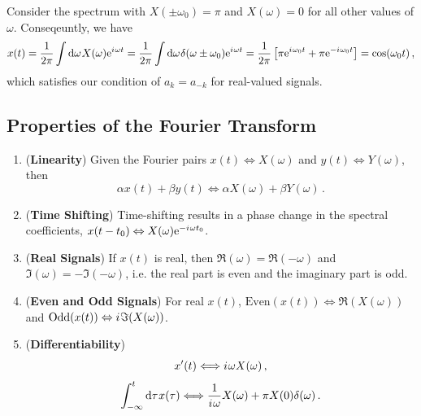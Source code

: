 \begin{exmp}
  Consider the spectrum with $X(\pm\omega_0) = \pi$ and $X(\omega) = 0$
  for all other values of $\omega$. Conseqeuntly, we have
  \begin{displaymath}
    x(t) = \frac{1}{2\pi}\int\mathrm{d}\omega\mkern1muX(\omega)\mathrm{e}^{{i\mkern1mu}\omega t}
    = \frac{1}{2\pi} \int\mathrm{d}\omega\mkern1mu\delta(\omega\pm\omega_0)\mathrm{e}^{{i\mkern1mu}\omega t}
    = \frac{1}{2\pi}\left[\pi\mathrm{e}^{{i\mkern1mu}\omega_0 t} + \pi\mathrm{e}^{-{i\mkern1mu}\omega_0 t}\right]
    = \cos(\omega_0 t) \,,
  \end{displaymath}
  which satisfies our condition of $a_k = a_{-k}$ for real-valued signals.
\end{exmp}

\subsection{Properties of the Fourier Transform}
%
\begin{enumerate}
\item (\textbf{Linearity}) Given the Fourier pairs $x(t) \Leftrightarrow X(\omega)$ and
  $y(t) \Leftrightarrow Y(\omega)$, then
  \begin{displaymath}
    \alpha x(t) + \beta y(t) \Leftrightarrow \alpha X(\omega) + \beta Y(\omega) \,.
  \end{displaymath}
\item (\textbf{Time Shifting}) Time-shifting results in a phase change in the
  spectral coefficients, $x(t-t_0) \Leftrightarrow X(\omega)\mathrm{e}^{-{i\mkern1mu}\omega t_0}$.
\item (\textbf{Real Signals}) If $x(t)$ is real, then $\Re(\omega) = \Re(-\omega)$
  and $\Im(\omega) = -\Im(-\omega)$, i.e. the real part is even and the imaginary
  part is odd.
\item (\textbf{Even and Odd Signals}) For real $x(t)$,
  $\mathrm{Even}(x(t)) \Leftrightarrow \Re(X(\omega))$ and
  $\mathrm{Odd}(x(t)) \Leftrightarrow {i\mkern1mu}\Im(X(\omega))$.
\item (\textbf{Differentiability})
  \begin{displaymath}
    x^\prime(t) \Longleftrightarrow {i\mkern1mu}\omega X(\omega) \,,
  \end{displaymath}
  \begin{displaymath}
    \int_{-\infty}^t \mathrm{d}\tau\mkern1mux(\tau) \Longleftrightarrow \frac{1}{{i\mkern1mu}\omega}X(\omega) + \pi X(0)\delta(\omega) \,.
  \end{displaymath}
\end{enumerate}
